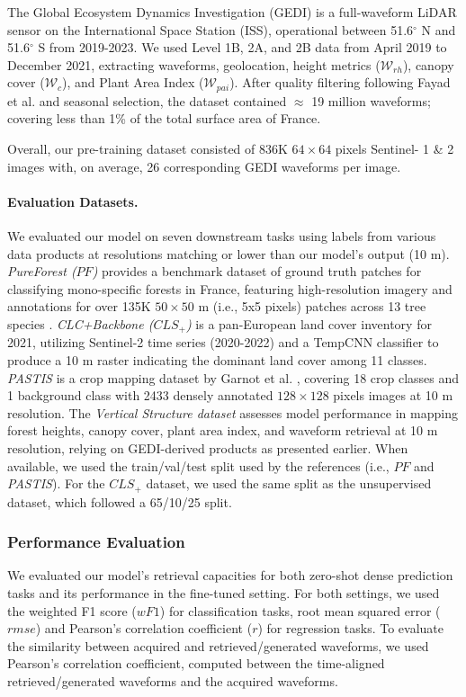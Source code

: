 The Global Ecosystem Dynamics Investigation (GEDI) is a full-waveform LiDAR sensor on the International Space Station (ISS), operational between 51.6$^{\circ}$ N and 51.6$^{\circ}$ S from 2019-2023. We used Level 1B, 2A, and 2B data from April 2019 to December 2021, extracting waveforms, geolocation, height metrics ($\mathcal{W}_{rh}$), canopy cover ($\mathcal{W}_{c}$), and Plant Area Index ($\mathcal{W}_{pai}$). After quality filtering following Fayad et al.  and seasonal selection, the dataset contained $\approx$ 19 million waveforms; covering less than 1\% of the total surface area of France.

Overall, our pre-training dataset consisted of 836K $64 \times 64$ pixels Sentinel- 1 \& 2 images with, on average, 26 corresponding GEDI waveforms per image.

\paragraph{Evaluation Datasets.}
We evaluated our model on seven downstream tasks using labels from various data products at resolutions matching or lower than our model's output (10 m). 
\emph{PureForest ($PF$)} provides a benchmark dataset of ground truth patches for classifying mono-specific forests in France, featuring high-resolution imagery and annotations for over 135K $50 \times 50$ m (i.e., 5x5 pixels) patches across 13 tree species \cite{gaydon2024pureforest}. \emph{CLC+Backbone ($CLS_+$)} is a pan-European land cover inventory for 2021, utilizing Sentinel-2 time series (2020-2022) and a TempCNN classifier \citep{Pelletier2019} to produce a 10 m raster indicating the dominant land cover among 11 classes. \emph{PASTIS} is a crop mapping dataset by Garnot et al. , covering 18 crop classes and 1 background class with 2433 densely annotated $128 \times 128$ pixels images at 10 m resolution. The \emph{Vertical Structure dataset} assesses model performance in mapping forest heights, canopy cover, plant area index, and waveform retrieval at 10 m resolution, relying on GEDI-derived products as presented earlier. When available, we used the train/val/test split used by the references (i.e., $PF$ and \emph{PASTIS}). For the $CLS_+$ dataset, we used the same split as the unsupervised dataset, which followed a 65/10/25 split. 

\subsubsection{Performance Evaluation}
We evaluated our model's retrieval capacities for both zero-shot dense prediction tasks and its performance in the fine-tuned setting. For both settings, we used the weighted F1 score ($wF1$) for classification tasks, root mean squared error ($rmse$) and Pearson's correlation coefficient ($r$) for regression tasks. To evaluate the similarity between acquired and retrieved/generated waveforms, we used Pearson's correlation coefficient, computed between the time-aligned retrieved/generated waveforms and the acquired waveforms.

